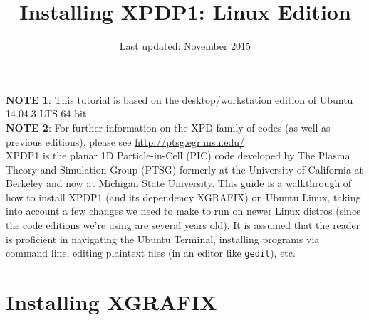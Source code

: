 \documentclass{article}
\title{Installing XPDP1: Linux Edition}
\author{}
\date{Last updated: November 2015}
\begin{document}
	\maketitle
	
	\noindent \textbf{NOTE 1}: This tutorial is based on the desktop/workstation edition of Ubuntu 14.04.3 LTS 64 bit \\
	\textbf{NOTE 2}: For further information on the XPD family of codes (as well as previous editions), please see \url{http://ptsg.egr.msu.edu/} \\
	
	\noindent XPDP1 is the planar 1D Particle-in-Cell (PIC) code developed by The Plasma Theory and Simulation Group (PTSG) formerly at the University of California at Berkeley and now at Michigan State University. This guide is a walkthrough of how to install XPDP1 (and its dependency XGRAFIX) on Ubuntu Linux, taking into account a few changes we need to make to run on newer Linux distros (since the code editions we're using are several years old). It is assumed that the reader is proficient in navigating the Ubuntu Terminal, installing programs via command line, editing plaintext files (in an editor like \verb|gedit|), etc.
	
	\section{Installing XGRAFIX}
	
\end{document}
